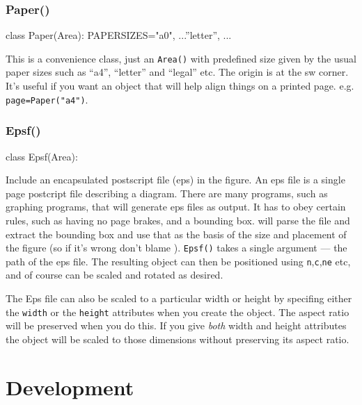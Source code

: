 \documentclass[a4paper]{book}
\begin{document}

\subsection{Paper()}
\label{sec:paper}
\begin{python}
class Paper(Area):
    PAPERSIZES={"a0", ...''letter'', ...}
\end{python}

This is a convenience class, just an \Verb|Area()| with predefined
size given by the usual paper sizes such as ``a4'', ``letter'' and
``legal'' etc. The origin is at the sw corner. It's useful if you want
an object that will help align things on a printed page. e.g.
\Verb|page=Paper("a4")|.


\subsection{Epsf()}
\label{sec:epsf}
\begin{python}
class Epsf(Area):
\end{python}

Include an encapsulated postscript file (eps) in the figure. An eps
file is a single page postcript file describing a diagram. There are
many programs, such as graphing programs, that will generate eps files
as output.  It has to obey certain rules, such as having no page
brakes, and a bounding box.  \pyscript will parse the file and
extract the bounding box and use that as the basis of the size and
placement of the figure (so if it's wrong don't blame \pyscript).
\Verb|Epsf()| takes a single argument --- the path of the eps file.
The resulting object can then be positioned using \Verb|n|,\Verb|c|,\Verb|ne|
etc, and of course can be scaled and rotated as desired.

The Eps file can also be scaled to a particular width or height by
specifing either the \Verb|width| or the \Verb|height| attributes when
you create the object. The aspect ratio will be preserved when you do
this.  If you give \emph{both} width and height attributes the object
will be scaled to those dimensions without preserving its aspect
ratio.

\chapter{Development}
\end{document}
